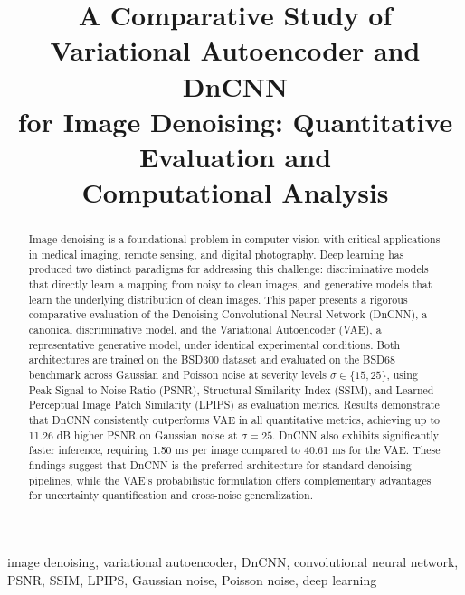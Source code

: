 \documentclass[conference]{IEEEtran}
\begin{document}
\title{A Comparative Study of Variational Autoencoder and DnCNN\\
for Image Denoising: Quantitative Evaluation and\\
Computational Analysis}

\author{
}

\maketitle

\begin{abstract}
Image denoising is a foundational problem in computer vision with
critical applications in medical imaging, remote sensing, and digital
photography. Deep learning has produced two distinct paradigms for
addressing this challenge: discriminative models that directly learn a
mapping from noisy to clean images, and generative models that learn the
underlying distribution of clean images. This paper presents a rigorous
comparative evaluation of the Denoising Convolutional Neural Network
(DnCNN), a canonical discriminative model, and the Variational
Autoencoder (VAE), a representative generative model, under identical
experimental conditions. Both architectures are trained on the BSD300
dataset and evaluated on the BSD68 benchmark across Gaussian and Poisson
noise at severity levels \(\sigma \in \{15, 25\}\), using Peak
Signal-to-Noise Ratio (PSNR), Structural Similarity Index (SSIM), and
Learned Perceptual Image Patch Similarity (LPIPS) as evaluation metrics.
Results demonstrate that DnCNN consistently outperforms VAE in all
quantitative metrics, achieving up to 11.26 dB higher PSNR on Gaussian
noise at \(\sigma = 25\). DnCNN also exhibits significantly faster
inference, requiring 1.50 ms per image compared to 40.61 ms for the VAE.
These findings suggest that DnCNN is the preferred architecture for
standard denoising pipelines, while the VAE's probabilistic formulation
offers complementary advantages for uncertainty quantification and
cross-noise generalization.
\end{abstract}

\begin{IEEEkeywords}
image denoising, variational autoencoder, DnCNN, convolutional neural
network, PSNR, SSIM, LPIPS, Gaussian noise, Poisson noise, deep learning
\end{IEEEkeywords}
\end{document}
